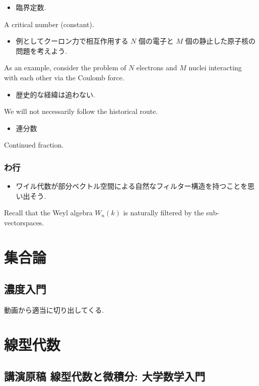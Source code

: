\documentclass[openany, a4paper, oneside]{jsbook}
\begin{document}
\begin{itemize}
\item 臨界定数. \cite{LiebSeiringer1}
\end{itemize}
A critical number (constant).

\begin{itemize}
\item 例としてクーロン力で相互作用する $N$ 個の電子と $M$ 個の静止した原子核の問題を考えよう. \cite{LiebSeiringer1}
\end{itemize}
As an example, consider the problem of $N$ electrons and $M$ nuclei interacting with each other via the Coulomb force.

\begin{itemize}
\item 歴史的な経緯は追わない.
\end{itemize}
We will not necessarily follow the historical route.

\begin{itemize}
\item 連分数
\end{itemize}
Continued fraction.
\section{わ行}

\begin{itemize}
\item ワイル代数が部分ベクトル空間による自然なフィルター構造を持つことを思い出そう.
\end{itemize}
Recall that the Weyl algebra $W_n(k)$ is naturally filtered by the sub-vectorspaces.

\onecolumn
\part{集合論}

\chapter{濃度入門}

動画から適当に切り出してくる.
\part{線型代数}

\chapter{講演原稿 線型代数と微積分: 大学数学入門}
\end{document}
